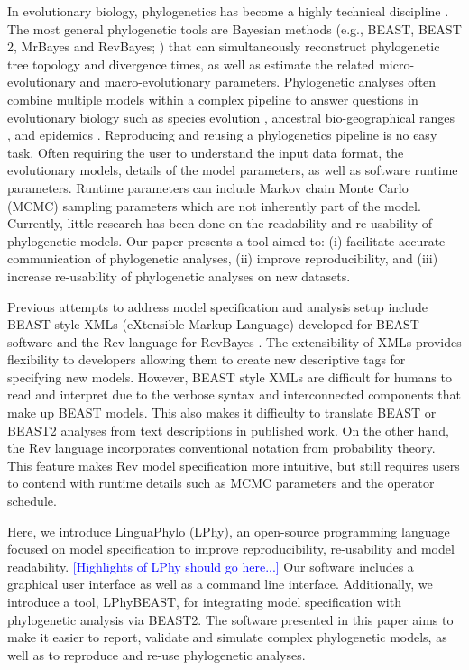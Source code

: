 \documentclass[10pt,letterpaper,table]{article}
\begin{document}
In evolutionary biology, phylogenetics has become a highly technical discipline \cite{oakley2014osiris}. 
The most general phylogenetic tools are Bayesian methods (e.g., BEAST, BEAST 2, MrBayes and
RevBayes; \cite{beast,beast2,revbayes,mrbayes}) 
that can simultaneously reconstruct phylogenetic tree topology and divergence times, as well as estimate the related micro-evolutionary and macro-evolutionary parameters. 
Phylogenetic analyses often combine 
multiple models within a complex pipeline to answer questions in evolutionary biology such as species evolution \cite{gavryushkina17,ogilvie21,zhang21}, ancestral bio-geographical ranges \cite{lemey10,landis18}, and 
epidemics \cite{faria21,douglas21}. 
Reproducing and reusing a phylogenetics pipeline is no easy task. 
Often requiring the user to understand the input data format, the evolutionary models, details of the model parameters, as well as software runtime parameters. 
Runtime parameters can include Markov chain Monte Carlo (MCMC) sampling parameters which are not inherently part of the model.
Currently, little research has been done on the readability and re-usability of phylogenetic models. 
Our paper presents a tool aimed to: (i) facilitate accurate communication of phylogenetic analyses, (ii) improve reproducibility, and (iii) increase re-usability of phylogenetic analyses on new datasets. 
 
Previous attempts to address model specification and analysis setup include BEAST style XMLs (eXtensible Markup Language) developed for BEAST software \cite{beast,beast2} and the Rev language for RevBayes \cite{revbayes}. 
The extensibility of XMLs provides flexibility to developers allowing them to create new
descriptive tags for specifying new models.
However, BEAST style XMLs are difficult for humans to read and interpret due to the verbose syntax and interconnected components that make up BEAST models. 
This also makes it difficulty to translate BEAST or BEAST2 analyses from text descriptions in published work. 
On the other hand, the Rev language 
\cite{revbayes} 
incorporates conventional notation from probability theory. 
This feature makes Rev model specification more intuitive, but still requires users to contend with runtime 
details %
such as MCMC parameters and the operator schedule.

Here, we introduce LinguaPhylo (LPhy), an open-source programming
language focused on model specification to improve reproducibility, re-usability and model readability. 
\textcolor{blue}{[Highlights of LPhy should go here...]}
Our software includes a graphical user interface as well as a command line interface. 
Additionally, we introduce a tool, LPhyBEAST, for integrating model specification with phylogenetic analysis via BEAST2.
The software presented in this paper aims to make it easier to report,
validate and simulate complex phylogenetic models, as well as to reproduce and re-use phylogenetic analyses.
\end{document}

